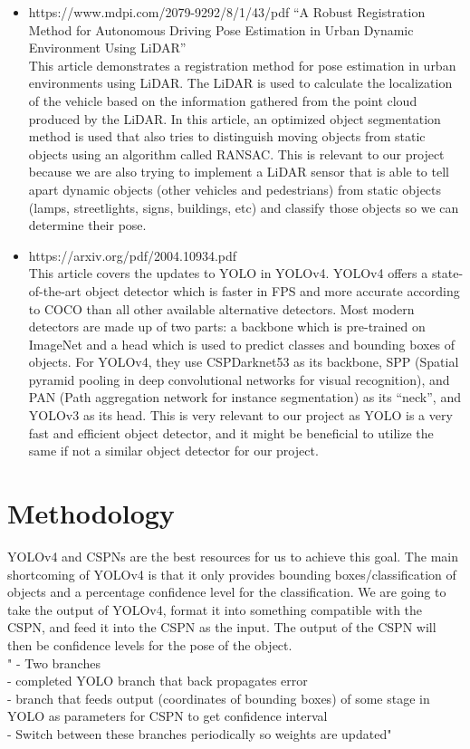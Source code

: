 \documentclass{article}
\begin{document}
\begin{itemize}
    \item https://www.mdpi.com/2079-9292/8/1/43/pdf “A Robust Registration Method for Autonomous Driving Pose Estimation in Urban Dynamic Environment Using LiDAR” \\
 This article demonstrates a registration method for pose estimation in urban environments using LiDAR. The LiDAR is used to calculate the localization of the vehicle based on the information gathered from the point cloud produced by the LiDAR. In this article, an optimized object segmentation method is used that also tries to distinguish moving objects from static objects using an algorithm called RANSAC. This is relevant to our project because we are also trying to implement a LiDAR sensor that is able to tell apart dynamic objects (other vehicles and pedestrians) from static objects (lamps, streetlights, signs, buildings, etc) and classify those objects so we can determine their pose.

    \item https://arxiv.org/pdf/2004.10934.pdf \\
This article covers the updates to YOLO in YOLOv4. YOLOv4 offers a state-of-the-art object detector which is faster in FPS and more accurate according to COCO than all other available alternative detectors. Most modern detectors are made up of two parts: a backbone which is pre-trained on ImageNet and a head which is used to predict classes and bounding boxes of objects. For YOLOv4, they use CSPDarknet53 as its backbone, SPP (Spatial pyramid pooling in deep convolutional networks for visual recognition), and PAN (Path aggregation network for instance segmentation) as its “neck”, and YOLOv3 as its head. This is very relevant to our project as YOLO is a very fast and efficient object detector, and it might be beneficial to utilize the same if not a similar object detector for our project.

\end{itemize}

\section{Methodology}
YOLOv4 and CSPNs are the best resources for us to achieve this goal. The main shortcoming of YOLOv4 is that it only provides bounding boxes/classification of objects and a percentage confidence level for the classification. We are going to take the output of YOLOv4, format it into something compatible with the CSPN, and feed it into the CSPN as the input. The output of the CSPN will then be confidence levels for the pose of the object. \\
" - Two branches \\
- completed YOLO branch that back propagates error \\
- branch that feeds output (coordinates of bounding boxes) of some stage in YOLO as parameters for CSPN to get confidence interval \\
- Switch between these branches periodically so weights are updated" \\
\end{document}
